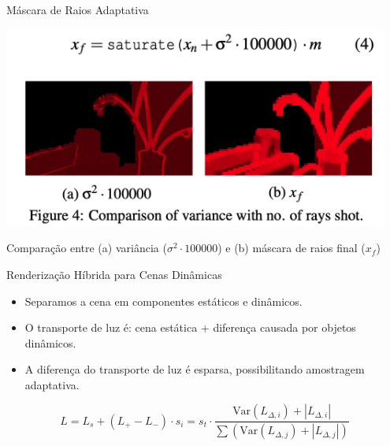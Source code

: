 \documentclass[aspectratio=169,xcolor=table]{beamer}
\begin{document}
\begin{frame}{Máscara de Raios Adaptativa}
    \begin{center}
        \includegraphics[width=0.95\textwidth]{mascara-raios-adaptativos}
    \end{center}
    \begin{center}
        \small{Comparação entre (a) variância ($\sigma^2 \cdot 100000$) e (b) máscara de raios final ($x_f$)}
    \end{center}
\end{frame}

\begin{frame}{Renderização Híbrida para Cenas Dinâmicas}
    \begin{itemize}
        \item Separamos a cena em componentes estáticos e dinâmicos.
        \item O transporte de luz é: cena estática + diferença causada por objetos dinâmicos.
        \item A diferença do transporte de luz é esparsa, possibilitando amostragem adaptativa.
    \end{itemize}
    \begin{equation*}
        L = L_s + (L_+ - L_-) \cdot s_i = s_t \cdot \frac{\text{Var}(L_{\Delta,i}) + |L_{\Delta,i}|}{\sum(\text{Var}(L_{\Delta,j}) + |L_{\Delta,j}|)}
    \end{equation*}
\end{frame}
\end{document}
